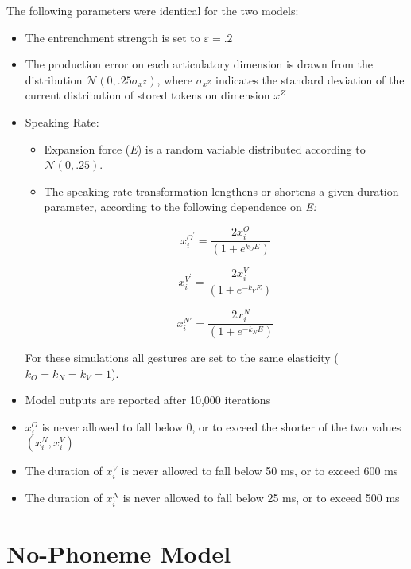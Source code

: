The following parameters were identical for the two models:
\begin{itemize}
\item The entrenchment strength is set to $\varepsilon=.2$
\item The production error on each articulatory dimension is drawn from
the distribution $\mathcal{\mathscr{N}}\left(0,.25\sigma_{x^{Z}}\right)$,
where $\sigma_{x^{Z}}$ indicates the standard deviation of the current
distribution of stored tokens on dimension $x^{Z}$
\item Speaking Rate:
\begin{itemize}
\item Expansion force (\emph{E}) is a random variable distributed according
to $\mathcal{\mathscr{N}\left(\mathrm{0,.25}\right)}$. 
\item The speaking rate transformation lengthens or shortens a given duration
parameter, according to the following dependence on \emph{E:}

\begin{equation}
x_{i}^{O^{\prime}}=\frac{2x_{i}^{O}}{(1+e^{k_{O}E})}\label{eq:Speaking rate transform-1}
\end{equation}

\begin{equation}
x_{i}^{V^{\prime}}=\frac{2x_{i}^{V}}{(1+e^{-k_{V}E})}\label{eq:Speaking rate transform-1-1}
\end{equation}

\begin{equation}
x_{i}^{N\prime}=\frac{2x_{i}^{N}}{(1+e^{-k_{N}E})}\label{eq:Speaking rate transform-1-1-1}
\end{equation}

\end{itemize}
For these simulations all gestures are set to the same elasticity
($k_{O}=k_{N}=k_{V}=1$). 
\item Model outputs are reported after 10,000 iterations
\item $x_{i}^{O}$ is never allowed to fall below 0, or to exceed the shorter
of the two values $(x_{i}^{N},x_{i}^{V})$
\item The duration of $x_{i}^{V}$ is never allowed to fall below 50 ms,
or to exceed 600 ms
\item The duration of $x_{i}^{N}$ is never allowed to fall below 25 ms,
or to exceed 500 ms
\end{itemize}

\section{No-Phoneme Model}

